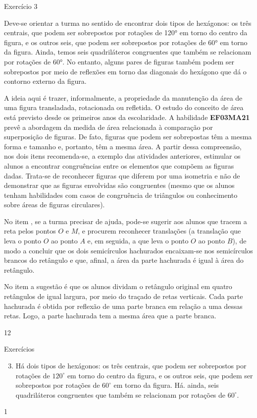 \clearmargin
\marginpar{\vspace{-3em}}
\begin{sugestions}{Exercício 3}
{
Deve-se orientar a turma no sentido de encontrar dois tipos de hexágonos: os três centrais, que podem ser sobrepostos por rotações de 120° em torno do centro da figura, e os outros seis, que podem ser sobrepostos por rotações de 60° em torno da figura. Ainda, temos seis quadriláteros congruentes que também se relacionam por rotações de 60°.  No entanto, alguns pares de figuras também podem ser sobrepostos por meio de reflexões em torno das diagonais do hexágono que dá o contorno externo da figura.


A ideia aqui é trazer, informalmente, a propriedade da manutenção da área de uma figura transladada, rotacionada ou refletida. O estudo do conceito de área está previsto desde os primeiros anos da escolaridade. A habilidade \textbf{EF03MA21} prevê a abordagem da medida de área relacionada à comparação por superposição de figuras. De fato, figuras que podem ser sobrepostas têm a mesma forma e tamanho e, portanto, têm a mesma área.   A partir dessa compreensão, nos dois itens recomenda-se, a exemplo das atividades anteriores, estimular os alunos a encontrar congruências entre os elementos que compõem as figuras dadas. Trata-se de reconhecer figuras que diferem por uma isometria e não de demonstrar que as figuras envolvidas são congruentes (mesmo que os alunos tenham habilidades com casos de congruência de triângulos ou conhecimento sobre áreas de figuras circulares). 

No item , se a turma precisar de ajuda,  pode-se sugerir aos alunos que tracem a reta pelos pontos $O$ e $M$, e procurem reconhecer translações (a translação que leva o ponto $O$ ao ponto $A$ e, em seguida, a que leva o ponto $O$ ao ponto $B$), de modo a concluir que os dois semicírculos hachurados encaixam-se nos semicírculos brancos do retângulo e que, afinal,  a área da parte hachurada é igual à área do retângulo. 

No item  a sugestão é que os alunos dividam o retângulo original em quatro retângulos de igual largura, por meio do traçado de retas verticais. Cada parte hachurada é obtida por reflexão de uma parte branca em relação a uma dessas retas. Logo, a parte hachurada tem a mesma área que a parte branca.

}{1}{2}
\end{sugestions}
\begin{answer}{Exercícios}
{\exerciselist
\begin{enumerate}\setcounter{enumi}{2}
\item Há dois tipos de hexágonos: os três centrais, que podem ser sobrepostos por rotações de $120^{\circ}$ em torno do centro da figura, e os outros seis, que podem ser sobrepostos por rotações de $60^{\circ}$ em torno da figura. Há. ainda, seis quadriláteros congruentes que também se relacionam por rotações de $60^{\circ}$.  
\end{enumerate}
}{1}
\end{answer}
